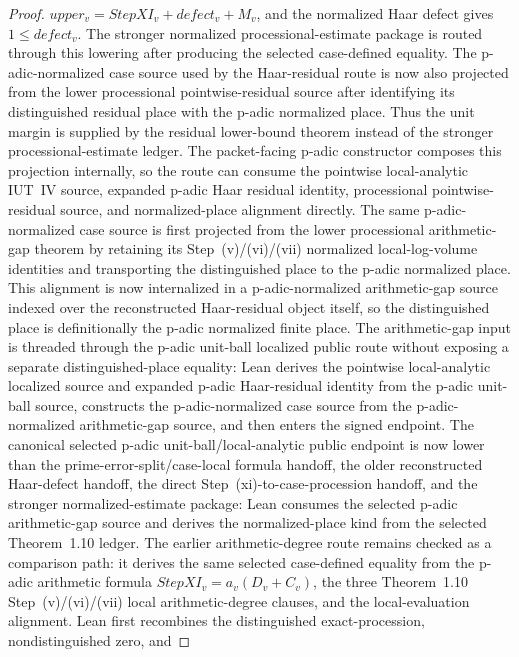 \begin{proof}
  \(upper_v=StepXI_v+defect_v+M_v\), and the normalized Haar defect gives
  \(1\leq defect_v\).  The stronger normalized processional-estimate package is
  routed through this lowering after producing the selected case-defined
  equality.  The p-adic-normalized
  case source used by the Haar-residual route is now also projected from the
  lower processional pointwise-residual source after identifying its
  distinguished residual place with the p-adic normalized place.  Thus the
  unit margin is supplied by the residual lower-bound theorem instead of the
  stronger processional-estimate ledger.  The packet-facing p-adic constructor
  composes this projection internally, so the route can consume the pointwise
  local-analytic IUT~IV source, expanded p-adic Haar residual identity,
  processional pointwise-residual source, and normalized-place alignment
  directly.  The same p-adic-normalized case source is first projected from the
  lower processional arithmetic-gap theorem by retaining its Step~(v)/(vi)/(vii)
  normalized local-log-volume identities and transporting the distinguished
  place to the p-adic normalized place.  This alignment is now internalized in
  a p-adic-normalized arithmetic-gap source indexed over the reconstructed
  Haar-residual object itself, so the distinguished place is definitionally the
  p-adic normalized finite place.  The arithmetic-gap input is threaded through
  the p-adic unit-ball localized public route without exposing a separate
  distinguished-place equality: Lean derives the pointwise local-analytic
  localized source and expanded p-adic Haar-residual identity from the p-adic
  unit-ball source, constructs the p-adic-normalized case source from the
  p-adic-normalized arithmetic-gap source, and then enters the signed endpoint.
  The canonical selected p-adic unit-ball/local-analytic public endpoint is now
  lower than the prime-error-split/case-local formula handoff, the older
  reconstructed Haar-defect handoff, the direct
  Step~(xi)-to-case-procession handoff, and the stronger normalized-estimate
  package: Lean consumes the selected p-adic arithmetic-gap source and derives
  the normalized-place kind from the selected Theorem~1.10 ledger.  The earlier
  arithmetic-degree route
  remains checked as a comparison path: it derives the same selected
  case-defined equality from the p-adic arithmetic formula
  \(StepXI_v=a_v(D_v+C_v)\), the three Theorem~1.10 Step~(v)/(vi)/(vii) local
  arithmetic-degree clauses, and the local-evaluation alignment.  Lean first
  recombines the distinguished exact-procession, nondistinguished zero, and

\end{proof}
